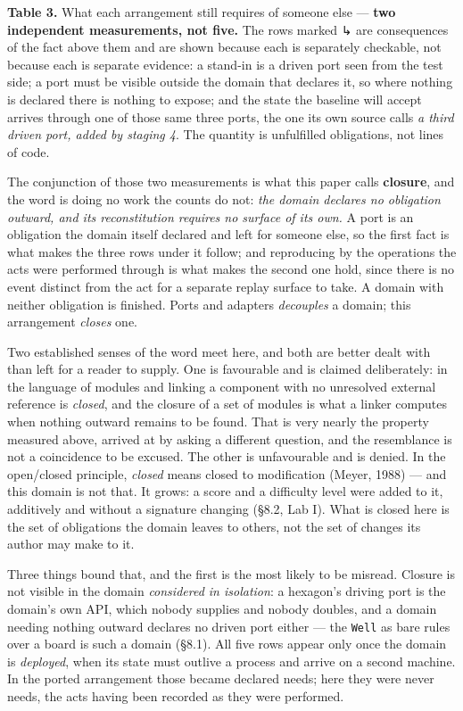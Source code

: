 \documentclass[
]{article}
\begin{document}
\textbf{Table 3.} What each arrangement still requires of someone else
--- \textbf{two independent measurements, not five.} The rows marked ↳
are consequences of the fact above them and are shown because each is
separately checkable, not because each is separate evidence: a stand-in
is a driven port seen from the test side; a port must be visible outside
the domain that declares it, so where nothing is declared there is
nothing to expose; and the state the baseline will accept arrives
through one of those same three ports, the one its own source calls
\emph{a third driven port, added by staging 4}. The quantity is
unfulfilled obligations, not lines of code.

The conjunction of those two measurements is what this paper calls
\textbf{closure}, and the word is doing no work the counts do not:
\emph{the domain declares no obligation outward, and its reconstitution
requires no surface of its own.} A port is an obligation the domain
itself declared and left for someone else, so the first fact is what
makes the three rows under it follow; and reproducing by the operations
the acts were performed through is what makes the second one hold, since
there is no event distinct from the act for a separate replay surface to
take. A domain with neither obligation is finished. Ports and adapters
\emph{decouples} a domain; this arrangement \emph{closes} one.

Two established senses of the word meet here, and both are better dealt
with than left for a reader to supply. One is favourable and is claimed
deliberately: in the language of modules and linking a component with no
unresolved external reference is \emph{closed}, and the closure of a set
of modules is what a linker computes when nothing outward remains to be
found. That is very nearly the property measured above, arrived at by
asking a different question, and the resemblance is not a coincidence to
be excused. The other is unfavourable and is denied. In the open/closed
principle, \emph{closed} means closed to modification (Meyer, 1988) ---
and this domain is not that. It grows: a score and a difficulty level
were added to it, additively and without a signature changing (§8.2, Lab
I). What is closed here is the set of obligations the domain leaves to
others, not the set of changes its author may make to it.

Three things bound that, and the first is the most likely to be misread.
Closure is not visible in the domain \emph{considered in isolation}: a
hexagon's driving port is the domain's own API, which nobody supplies
and nobody doubles, and a domain needing nothing outward declares no
driven port either --- the \texttt{Well} as bare rules over a board is
such a domain (§8.1). All five rows appear only once the domain is
\emph{deployed}, when its state must outlive a process and arrive on a
second machine. In the ported arrangement those became declared needs;
here they were never needs, the acts having been recorded as they were
performed.
\end{document}
